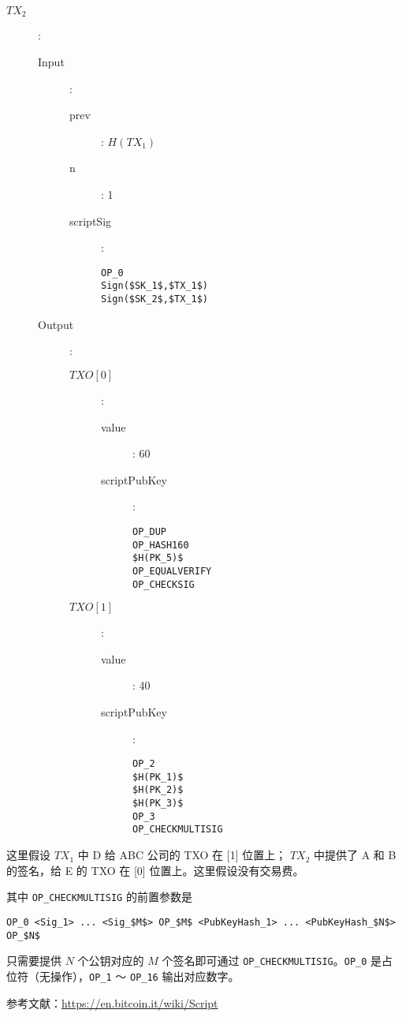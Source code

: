 \documentclass{sjtuarticle}
\begin{document}
\begin{solution}
\begin{multicols}{2}
\begin{description}
\begin{description}
\begin{description}
                \end{description}    
        \end{description}
\columnbreak
    \item[$TX_2$]:
        \begin{description}
            \item[Input]:
            \begin{description}
                \item[prev]: $H(TX_1)$
                \item[n]: 1 
                \item[scriptSig]:
\begin{lstlisting}
OP_0
Sign($SK_1$,$TX_1$)
Sign($SK_2$,$TX_1$)
\end{lstlisting}
            \end{description}
            \item[Output]:
            \begin{description}
                \item[{$TXO[0]$}]:
                \begin{description}
                    \item[value]: 60
                    \item[scriptPubKey]:
\begin{lstlisting}
OP_DUP
OP_HASH160
$H(PK_5)$
OP_EQUALVERIFY
OP_CHECKSIG
\end{lstlisting}
                \end{description}
                \item[{$TXO[1]$}]:
                \begin{description}
                    \item[value]: 40
                    \item[scriptPubKey]:
\begin{lstlisting}
OP_2
$H(PK_1)$
$H(PK_2)$
$H(PK_3)$
OP_3
OP_CHECKMULTISIG
\end{lstlisting}
                \end{description}
            \end{description}
        \end{description}
\end{description}
\end{multicols}

这里假设 $TX_1$ 中 D 给 ABC 公司的 TXO 在 [1] 位置上； $TX_2$ 中提供了 A 和 B 的签名，给 E 的 TXO 在 [0] 位置上。这里假设没有交易费。

其中 \verb"OP_CHECKMULTISIG" 的前置参数是
\begin{lstlisting}
OP_0 <Sig_1> ... <Sig_$M$> OP_$M$ <PubKeyHash_1> ... <PubKeyHash_$N$> OP_$N$
\end{lstlisting}
只需要提供 $N$ 个公钥对应的 $M$ 个签名即可通过 \verb"OP_CHECKMULTISIG"。\verb"OP_0" 是占位符（无操作），\verb"OP_1" ～ \verb"OP_16" 输出对应数字。

参考文献：\url{https://en.bitcoin.it/wiki/Script}

\end{solution}
\end{document}
